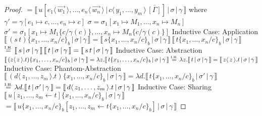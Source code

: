 \documentclass[a4paper,UKenglish,cleveref, autoref]{lipics-v2019}
\newcommand{\abs}[2]{\lambda #1 . #2}
\newcommand{\app}[2]{#1 \, #2}
\newcommand{\fake}[3]{#1 \langle \, #2 \, \rangle . #3}
\newcommand{\share}[3]{#1 [#2 \leftarrow #3]}
\newcommand{\dist}[5]{#1 [ #2 \, \vert \, \fakedist{#4}{#5} \, #3 ]}
\newcommand{\fakedist}[2]{#1 \langle \, #2 \, \rangle}
\newcommand{\sub}[3]{#1 \{ #2 / #3 \}}
\newcommand{\psub}[3]{#1 \{ #2 / #3 \}_{b}}
\newcommand{\readbackwmap}[3]{\llbracket \, #1 \, \vert \, #2 \, \vert \, #3  \, \rrbracket }
\newcommand{\IH}{\stackrel{\hbox{\tiny I.H.}}{\hbox{=}}}
\begin{document}
\begin{proof}
\newline
$= \readbackwmap{\dist{u}{\fakedist{e_{1}}{\vec{w_{1}}}, \dots, \fakedist{e_{n}}{\vec{w_{n}}}}{\overline{[\Gamma]}}{c}{y_{1}, \dots, y_{m}} }{\sigma}{\gamma}$
\newline
where
$\gamma' = \gamma [e_{1} \mapsto c, \dots, e_{n} \mapsto c]$
\newline
$\sigma = \sigma_{1} [x_{1} \mapsto M_{1} , \dots , x_{n} \mapsto M_{n} ]$
\newline
$\sigma' = \sigma_{1} [ x_{1} \mapsto M_{1} \sub{}{c}{\gamma(c)} , \dots , x_{n} \mapsto M_{n} \sub{}{c}{\gamma(c)} ]$
\newline
\newline
Inductive Case: Application
\newline
$\readbackwmap{(\app{s}{t})  \psub{}{x_{1}, \dots, x_{n}}{c}}{\sigma}{\gamma} = \app{\readbackwmap{s\psub{}{x_{1}, \dots, x_{n}}{c}}{\sigma}{\gamma}}{\readbackwmap{t\psub{}{x_{1}, \dots, x_{n}}{c}}{\sigma}{\gamma}}$
\newline
$\IH  \app{\readbackwmap{s}{\sigma}{\gamma}}{\readbackwmap{t}{\sigma}{\gamma}} = \readbackwmap{\app{s}{t}}{\sigma}{\gamma}$
\newline
\newline
Inductive Case: Abstraction
\newline
$\readbackwmap{(\fake{z}{z}{t})  \psub{}{x_{1}, \dots, x_{n}}{c}}{\sigma}{\gamma} = \abs{z}{\readbackwmap{t \psub{}{x_{1}, \dots, x_{n}}{c}}{\sigma}{\gamma}} \IH \abs{z}{\readbackwmap{t}{\sigma}{\gamma}} = \readbackwmap{\fake{z}{z}{t}}{\sigma}{\gamma}$
\newline
\newline
Inductive Case: Phantom-Abstraction
\newline
$\readbackwmap{(\fake{d}{z_{1}, \dots, z_{m}}{t}) \psub{}{x_{1}, \dots, x_{n}}{c}}{\sigma}{\gamma} = \abs{d}{\readbackwmap{t  \psub{}{x_{1}, \dots, x_{n}}{c}}{\sigma'}{\gamma}}$
\newline
$\IH \abs{d}{\readbackwmap{t}{\sigma'}{\gamma}} = \readbackwmap{\fake{d}{z_{1}, \dots, z_{m}}{t}}{\sigma}{\gamma}$
\newline
\newline
Inductive Case: Sharing
\newline
$\readbackwmap{\share{u}{z_{1}, \dots, z_{m}}{t} \psub{}{x_{1}, \dots, x_{n}}{c}}{\sigma}{\gamma}$
\newline
$ = \readbackwmap{\share{u \psub{}{x_{1}, \dots, x_{n}}{c}}{z_{1}, \dots, z_{m}}{t \psub{}{x_{1}, \dots, x_{n}}{c}} }{\sigma}{\gamma} $
\newline

\end{proof}
\end{document}
